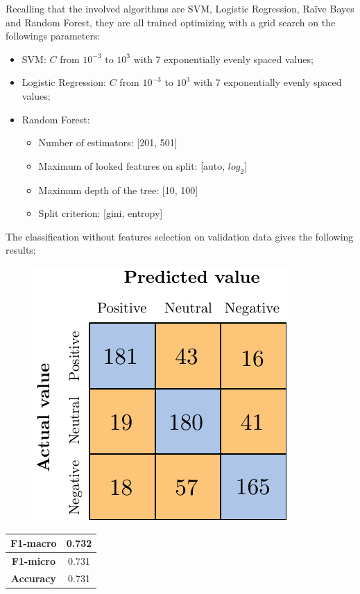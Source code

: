 Recalling that the involved algorithms are SVM, Logistic Regression, Ra{\"i}ve Bayes and Random Forest, they are all trained optimizing with a grid search on the followings parameters:
\begin{itemize}
	\item SVM: $C$ from $10^{-3}$ to $10^3$ with 7 exponentially evenly spaced values;
	\item Logistic Regression: $C$ from $10^{-3}$ to $10^3$ with 7 exponentially evenly spaced values;
	\item Random Forest: 
	\begin{itemize}
		\item Number of estimators: [201, 501]
		\item Maximum of looked features on split: [auto, $log_2$]
		\item Maximum depth of the tree: [10, 100]
		\item Split criterion: [gini, entropy]
	\end{itemize}
\end{itemize}

The classification without features selection on validation data gives the following results:


\begin{figure}[H]
	\centering
	\includegraphics[scale=1]{figures/conf_matrices/twitter_snt_bpef/twitter_snt_bpef_bfs.pdf}
	\label{fig:tw_snt_bpef_bfs}
\end{figure}

\begin{center}
	\begin{tabular}{ | c | c | } 
		\hline
		\textbf{F1-macro} & 0.732 \\
		\hline
		\textbf{F1-micro} & 0.731 \\ 
		\hline
		\textbf{Accuracy} & 0.731 \\ 
		\hline
	\end{tabular}
\end{center}

